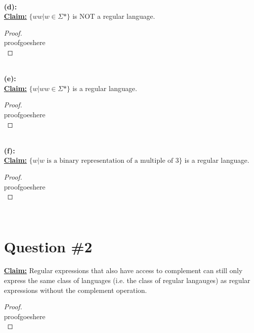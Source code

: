 \documentclass[12pt]{article}
\begin{document}
\leavevmode\\
\textbf{(d):} \\
\textbf{\underline{Claim:}} $\{ ww | w \in \Sigma* \}$ is NOT a regular language.
\begin{proof}
\leavevmode\\
    proofgoeshere \\
\end{proof}
\leavevmode\\
\textbf{(e):} \\
\textbf{\underline{Claim:}} $\{ w | ww \in \Sigma* \}$ is a regular language.
\begin{proof}
\leavevmode\\
    proofgoeshere \\
\end{proof}
\leavevmode\\
\textbf{(f):} \\
\textbf{\underline{Claim:}} $\{ w | w \text{ is a binary representation of a multiple of 3} \}$ is a regular language.
\begin{proof}
\leavevmode\\
    proofgoeshere \\
\end{proof}
\leavevmode\\
\pagebreak

\section*{Question \#2}
\textbf{\underline{Claim:}} Regular expressions that also have access to complement can still only express the same class of languages (i.e. the class of regular langauges) as regular expressions without the complement operation.
\begin{proof}
\leavevmode\\
    proofgoeshere \\
\end{proof}
\pagebreak
\end{document}
